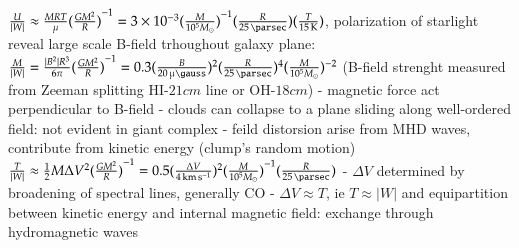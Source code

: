 \documentclass[main.tex]{subfiles}
\begin{document}
\begin{itemize}
$\frac{U}{|W|}\approx\frac{MRT}{\mu}\invers{(\frac{GM^2}{R})}=\num{3e-3}\invers{(\frac{M}{\num{e5}\msun})}(\frac{R}{\SI{25}{\parsec}})(\frac{T}{\SI{15}{\kelvin}})$, polarization of starlight reveal large scale B-field trhoughout galaxy plane: $\frac{M}{|W|}=\frac{|B^2|R^3}{6\pi}\invers{(\frac{GM^2}{R})}=0.3(\frac{B}{\SI{20}{\micro\gauss}})^2(\frac{R}{\SI{25}{\parsec}})^4(\frac{M}{\num{e5}\msun})\expy{-2}$ (B-field strenght measured from Zeeman splitting HI-$21 cm$ line or OH-$18 cm$) - magnetic force act perpendicular to B-field - clouds can collapse to a plane sliding along well-ordered field: not evident in giant complex - feild distorsion arise from MHD waves, contribute from kinetic energy (clump's random motion) $\frac{T}{|W|}\approx\frac{1}{2}M\Delta V^2\invers{(\frac{GM^2}{R})}=0.5(\frac{\Delta V}{\SI{4}{\kilo\meter\per\second}})^2\invers{(\frac{M}{\num{e5}\msun})}(\frac{R}{\SI{25}{\parsec}})$ - $\Delta V$ determined by broadening of spectral lines, generally CO - $\Delta V\approx T$, ie $T\approx|W|$ and equipartition between kinetic energy and internal magnetic field: exchange through hydromagnetic waves
\end{itemize}
\end{document}

